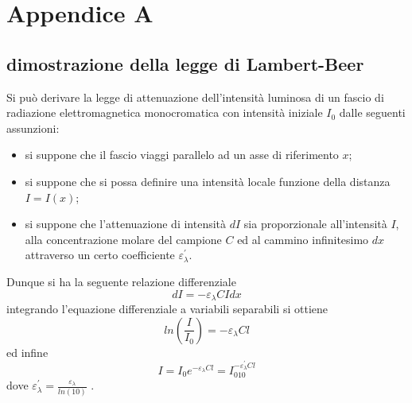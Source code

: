 \documentclass[a4paper, 12pt]{book}
\begin{document}
\section*{Appendice A}


\subsection{dimostrazione della legge di Lambert-Beer}

Si può derivare la legge di attenuazione dell'intensità luminosa di un fascio di radiazione elettromagnetica monocromatica con intensità iniziale $I_0$ dalle seguenti assunzioni:\begin{itemize}
    \item si suppone che il fascio viaggi parallelo ad un asse di riferimento $x$;
    \item si suppone che si possa definire una intensità locale funzione della distanza 		  $I = I(x)$;
    \item si suppone che l'attenuazione di intensità $dI$ sia proporzionale 						  all'intensità $I$, alla concentrazione molare del campione $C$ ed al cammino 				  infinitesimo $dx$ attraverso un certo coefficiente $\varepsilon_{\lambda}^{'}				  $.
\end{itemize}
Dunque si ha la seguente relazione differenziale
\begin{equation*}
    dI = -\varepsilon_{\lambda}CI dx
\end{equation*}
integrando l'equazione differenziale a variabili separabili si ottiene
\begin{equation*}
    ln(\frac{I}{I_0}) = -\varepsilon_{\lambda}Cl
\end{equation*}
ed infine
\begin{equation*}
    I = I_0e^{-\varepsilon_{\lambda}Cl} = I_010^{-\varepsilon_{\lambda}^{'}Cl}
\end{equation*}
dove $\varepsilon_{\lambda}^{'} = \frac{\varepsilon_{\lambda}}{ln(10)}$ .




\thispagestyle{empty}
\newpage
\thispagestyle{empty}





\end{document}
